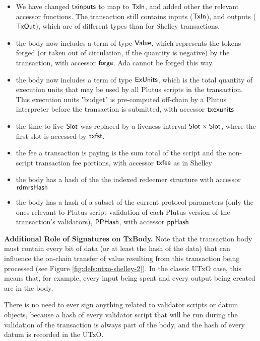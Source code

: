 \begin{itemize}

  \item We have changed $\mathsf{txinputs}$ to map to $\mathsf{TxIn}$, and added other the relevant
  accessor functions. The transaction still contains inputs ($\mathsf{TxIn}$), and
  outputs ($\mathsf{TxOut}$), which are of different types than for Shelley transactions.
  \item the body now includes a term of type $\mathsf{Value}$, which represents
  the tokens forged (or taken out of circulation, if the quantity is negative)
  by the transaction,
  with accessor $\mathsf{forge}$. Ada cannot be forged this way.
  \item the body now includes a term of type $\mathsf{ExUnits}$, which is the total quantity of execution units
  that may be used by all Plutus scripts in the transaction.
  This execution units "budget" is pre-computed off-chain by a Plutus interpreter
  before the transaction is submitted, with accessor $\mathsf{txexunits}$
  \item the
  time to live $\mathsf{Slot}$ was replaced by a liveness interval $\mathsf{Slot} \times \mathsf{Slot}$,
  where the first slot is accessed by $\mathsf{txfst}$.
  \item the fee a transaction is paying is the sum total of the script and the
  non-script transaction fee portions, with accessor $\mathsf{txfee}$ as in Shelley
  \item the body has a hash of the the indexed redeemer structure
  with accessor $\mathsf{rdmrsHash}$
  \item the body has a hash of a subset of the current protocol parameters
  (only the ones relevant to Plutus script validation of each Plutus
  version of the transaction's validators), $\mathsf{PPHash}$, with accessor $\mathsf{ppHash}$
\end{itemize}

\textbf{Additional Role of Signatures on TxBody.}
Note that the transaction body must contain every bit of data
(or at least the hash of the data) that can influence the
on-chain transfer of value resulting from this transaction being processed
(see Figure \ref{fig:defs:utxo-shelley-2}).
In the classic UTxO case, this means that, for example,
every input being spent and every output being created are in the body.

There is no need to ever sign anything related to validator scripts or datum objects,
because a hash of every validator script that will be run during the validation
of the transaction is always part of the body, and the hash of every datum
is recorded in the UTxO.

